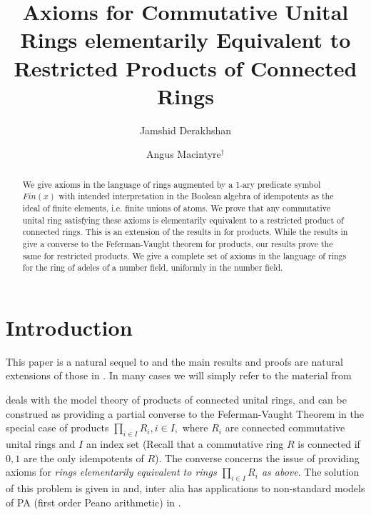 \documentclass[12pt]{amsart}
\title[Axioms for Restricted Products]{Axioms for Commutative Unital Rings elementarily Equivalent to Restricted Products of Connected Rings}
\author[J. Derakhshan]{Jamshid Derakhshan}
\author[A. Macintyre]{Angus Macintyre${}^{\dag}$}
\numberwithin{equation}{section}
\begin{document}
\keywords{}

    
\begin{abstract} 
We give axioms in the language of rings augmented by a 1-ary predicate symbol $Fin(x)$ with intended interpretation 
in the Boolean algebra of idempotents as the ideal of finite elements, i.e. finite unions of atoms. We prove that any 
commutative unital ring satisfying these axioms is elementarily equivalent to a restricted product of 
connected rings. This is an extension of the results in \cite{elem-prod} for products. While the results in \cite{elem-prod} give a converse to the Feferman-Vaught theorem for products, our results prove the same for restricted products. We give a complete set of axioms in the language of rings for the ring of adeles of a number field, uniformly in the number field.


\end{abstract}

\maketitle



\section{\bf Introduction}\label{sec-introduction}



This paper is a natural sequel to \cite{elem-prod} and the main results and proofs are natural extensions of those in \cite{elem-prod}. In many cases we will simply refer to the material from \cite{elem-prod}

\cite{elem-prod} deals with the model theory of products of connected unital rings, and can be construed as providing a partial converse to the Feferman-Vaught Theorem \cite{FV} in the special case of products $\prod_{i\in I} R_i, i\in I,$ where $R_i$ are connected commutative unital rings and $I$ an index set (Recall that a commutative ring $R$ is connected if $0,1$ are the only idempotents of $R$).  The converse concerns the issue of providing axioms for {\it rings elementarily equivalent to rings $\prod_{i\in I} R_i$ as above}.  The solution of this problem is given in \cite{elem-prod} and, inter alia has applications to non-standard models of PA (first order Peano arithmetic) in \cite{PDAJM}.
\end{document}

